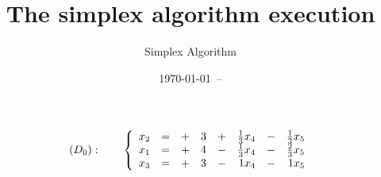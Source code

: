 \documentclass{article}
\title{The simplex algorithm execution}
\author{Simplex Algorithm}
\date{\today ~-- \currenttime}
\begin{document}
\maketitle

\[
(D_0):\qquad \left \{
\begin{array}{rc*3{cr}}
x_2 & =& + &3& + &\frac{1}{3}x_4 & - &\frac{1}{3}x_5 \\
x_1 & =& + &4& - &\frac{1}{3}x_4 & - &\frac{2}{3}x_5 \\
x_3 & =& + &3& - &1x_4 & - &1x_5 \\
\end{array} \right.
\]
\end{document}
